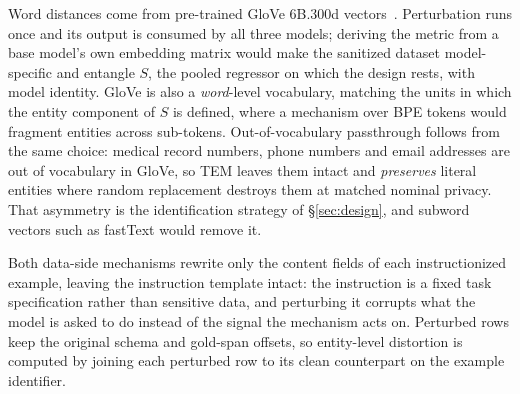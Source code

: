 Word distances come from pre-trained GloVe 6B.300d vectors~\citep{pennington2014glove}.
Perturbation runs once and its output is consumed by all three models;
deriving the metric from a base model's own embedding matrix would make the sanitized dataset model-specific and entangle $S$,
the pooled regressor on which the design rests,
with model identity.
GloVe is also a \textit{word}-level vocabulary,
matching the units in which the entity component of $S$ is defined,
where a mechanism over BPE tokens would fragment entities across sub-tokens.
Out-of-vocabulary passthrough follows from the same choice:
medical record numbers,
phone numbers and email addresses are out of vocabulary in GloVe,
so TEM leaves them intact and \textit{preserves} literal entities where random replacement destroys them at matched nominal privacy.
That asymmetry is the identification strategy of \S\ref{sec:design},
and subword vectors such as fastText would remove it.

Both data-side mechanisms rewrite only the content fields of each instructionized example,
leaving the instruction template intact:
the instruction is a fixed task specification rather than sensitive data,
and perturbing it corrupts what the model is asked to do instead of the signal the mechanism acts on.
Perturbed rows keep the original schema and gold-span offsets,
so entity-level distortion is computed by joining each perturbed row to its clean counterpart on the example identifier.

